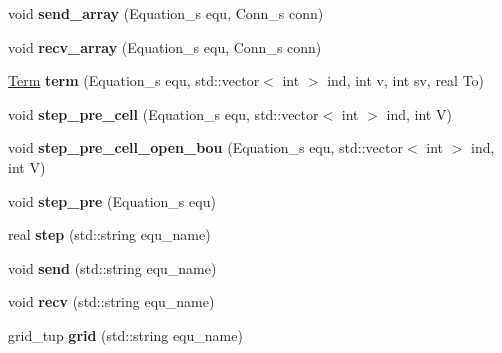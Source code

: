 \begin{DoxyCompactItemize}
\item 
\hypertarget{classFace_afdbbc9947c0d7cd84b427bd7b503b15b}{void {\bfseries send\-\_\-array} (Equation\-\_\-s equ, Conn\-\_\-s conn)}\label{classFace_afdbbc9947c0d7cd84b427bd7b503b15b}

\item 
\hypertarget{classFace_a57bdfcf1ebf5e208b611f98b7ddeca00}{void {\bfseries recv\-\_\-array} (Equation\-\_\-s equ, Conn\-\_\-s conn)}\label{classFace_a57bdfcf1ebf5e208b611f98b7ddeca00}

\item 
\hypertarget{classFace_aa827a7d26d1b90507bb4252830b3ecf5}{\hyperlink{structTerm}{Term} {\bfseries term} (Equation\-\_\-s equ, std\-::vector$<$ int $>$ ind, int v, int sv, real To)}\label{classFace_aa827a7d26d1b90507bb4252830b3ecf5}

\item 
\hypertarget{classFace_aba0d776b0f0e7cceee8729825347b5cc}{void {\bfseries step\-\_\-pre\-\_\-cell} (Equation\-\_\-s equ, std\-::vector$<$ int $>$ ind, int V)}\label{classFace_aba0d776b0f0e7cceee8729825347b5cc}

\item 
\hypertarget{classFace_a2bafbcce9f57fd3bdefd9f23a62c853d}{void {\bfseries step\-\_\-pre\-\_\-cell\-\_\-open\-\_\-bou} (Equation\-\_\-s equ, std\-::vector$<$ int $>$ ind, int V)}\label{classFace_a2bafbcce9f57fd3bdefd9f23a62c853d}

\item 
\hypertarget{classFace_a8af2298846b8a666332f00de91796844}{void {\bfseries step\-\_\-pre} (Equation\-\_\-s equ)}\label{classFace_a8af2298846b8a666332f00de91796844}

\item 
\hypertarget{classFace_a62a7d504c1e99dfc928b7e27b544893b}{real {\bfseries step} (std\-::string equ\-\_\-name)}\label{classFace_a62a7d504c1e99dfc928b7e27b544893b}

\item 
\hypertarget{classFace_a781b3843f33507116afa741579317e83}{void {\bfseries send} (std\-::string equ\-\_\-name)}\label{classFace_a781b3843f33507116afa741579317e83}

\item 
\hypertarget{classFace_a4c67c45fa975e6fb3bc3d4ee0fa6a25f}{void {\bfseries recv} (std\-::string equ\-\_\-name)}\label{classFace_a4c67c45fa975e6fb3bc3d4ee0fa6a25f}

\item 
\hypertarget{classFace_a18aba75abf718dd35c17153220ad929b}{grid\-\_\-tup {\bfseries grid} (std\-::string equ\-\_\-name)}\label{classFace_a18aba75abf718dd35c17153220ad929b}

\end{DoxyCompactItemize}

